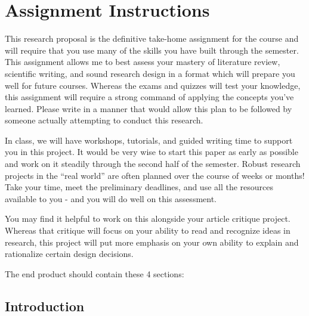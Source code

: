 \documentclass[
  12pt,
  letterpaper,
]{scrartcl}
\renewcommand*\contentsname{Table of contents}
\newcommand\contentsname{Table of contents}
\begin{document}


\pagestyle{scrheadings}

\frenchspacing %

\renewcommand*\contentsname{Table of Contents}
{
\hypersetup{linkcolor=}
\setcounter{tocdepth}{2}
\tableofcontents
}

\newpage{}

\section{Assignment Instructions}\label{assignment-instructions}

This research proposal is the definitive take-home assignment for the
course and will require that you use many of the skills you have built
through the semester. This assignment allows me to best assess your
mastery of literature review, scientific writing, and sound research
design in a format which will prepare you well for future courses.
Whereas the exams and quizzes will test your knowledge, this assignment
will require a strong command of applying the concepts you've learned.
Please write in a manner that would allow this plan to be followed by
someone actually attempting to conduct this research.

In class, we will have workshops, tutorials, and guided writing time to
support you in this project. It would be very wise to start this paper
as early as possible and work on it steadily through the second half of
the semester. Robust research projects in the ``real world'' are often
planned over the course of weeks or months! Take your time, meet the
preliminary deadlines, and use all the resources available to you - and
you will do well on this assessment.

You may find it helpful to work on this alongside your article critique
project. Whereas that critique will focus on your ability to read and
recognize ideas in research, this project will put more emphasis on your
own ability to explain and rationalize certain design decisions.

The end product should contain these 4 sections:

\subsection{Introduction}\label{introduction}
\end{document}
